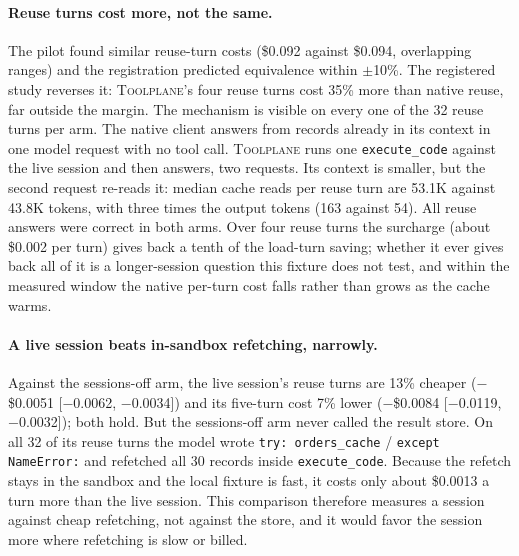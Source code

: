 \documentclass[10pt,twocolumn]{article}
\newcommand{\toolplane}{\textsc{Toolplane}\xspace}
\newcommand{\usd}[1]{\$#1}
\begin{document}
\paragraph{Reuse turns cost more, not the same.}  The pilot found similar
reuse-turn costs (\usd{0.092} against \usd{0.094}, overlapping ranges) and the
registration predicted equivalence within $\pm$10\%.  The registered study
reverses it: \toolplane's four reuse turns cost 35\% more than native reuse,
far outside the margin.  The mechanism is visible on every one of the 32 reuse
turns per arm.  The native client answers from records already in its context
in one model request with no tool call.  \toolplane runs one
\texttt{execute\_code} against the live session and then answers, two requests.
Its context is smaller, but the second request re-reads it: median cache reads
per reuse turn are 53.1K against 43.8K tokens, with three times the output
tokens (163 against 54).  All reuse answers were correct in both arms.  Over
four reuse turns the surcharge (about \usd{0.002} per turn) gives back a tenth
of the load-turn saving; whether it ever gives back all of it is a
longer-session question this fixture does not test, and within the measured
window the native per-turn cost falls rather than grows as the cache warms.

\paragraph{A live session beats in-sandbox refetching, narrowly.}  Against the
sessions-off arm, the live session's reuse turns are 13\% cheaper
($-$\usd{0.0051} [$-$0.0062, $-$0.0034]) and its five-turn cost 7\% lower
($-$\usd{0.0084} [$-$0.0119, $-$0.0032]); both hold.  But the sessions-off arm
never called the result store.  On all 32 of its reuse turns the model wrote
\texttt{try: orders\_cache} / \texttt{except NameError:} and refetched all 30
records inside \texttt{execute\_code}.  Because the refetch stays in the sandbox
and the local fixture is fast, it costs only about \usd{0.0013} a turn more than
the live session.  This comparison therefore measures a session against cheap
refetching, not against the store, and it would favor the session more where
refetching is slow or billed.
\end{document}
